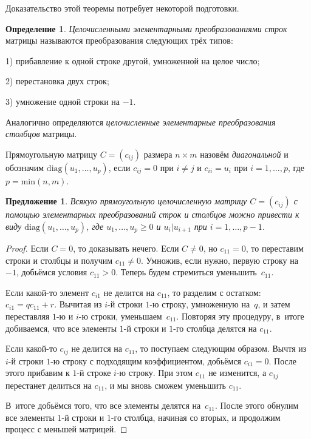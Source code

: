 \documentclass[a4paper,10pt]{amsart}
\newtheorem{proposition}{Предложение}
\theoremstyle{definition}
\newtheorem{definition}{Определение}
\theoremstyle{remark}
\begin{document}
\smallskip


Доказательство этой теоремы потребует некоторой подготовки.

\begin{definition}
{\it Целочисленными элементарными преобразованиями строк} матрицы
называются преобразования следующих трёх типов:

1) прибавление к одной строке другой, умноженной на целое число;

2) перестановка двух строк;

3) умножение одной строки на $-1$.

Аналогично определяются {\it целочисленные элементарные
преобразования столбцов} матрицы.
\end{definition}

Прямоугольную матрицу $C=(c_{ij})$ размера $n\times m$ назовём {\it
диагональной} и обозначим $\text{diag}(u_1,\ldots,u_p)$, если
$c_{ij}=0$ при $i\ne j$ и $c_{ii}=u_i$ при $i=1,\ldots,p$, где
$p=\text{min}(n,m)$.

\begin{proposition} \label{palg}
Всякую прямоугольную целочисленную матрицу $C=(c_{ij})$ с помощью
элементарных преобразований строк и столбцов можно привести к виду
$\text{diag}(u_1,\ldots,u_p)$, где $u_1,\ldots,u_p \geqslant 0$ и
$u_i|u_{i+1}$ при $i=1,\ldots,p-1$.
\end{proposition}

\begin{proof}
Если $C=0$, то доказывать нечего. Если $C\ne 0$, но $c_{11}=0$, то
переставим строки и столбцы и получим $c_{11}\ne 0$. Умножив, если
нужно, первую строку на $-1$, добьёмся условия $c_{11}>0$. Теперь
будем стремиться уменьшить~$c_{11}$.

Если какой-то элемент $c_{i1}$ не делится на $c_{11}$, то разделим с
остатком: $c_{i1}=qc_{11}+r$. Вычитая из $i$-й строки $1$-ю строку,
умноженную на~$q$, и затем переставляя $1$-ю и $i$-ю строки,
уменьшаем~$c_{11}$. Повторяя эту процедуру, в~итоге добиваемся, что
все элементы $1$-й строки и $1$-го столбца делятся на $c_{11}$.

Если какой-то $c_{ij}$ не делится на $c_{11}$, то поступаем
следующим образом. Вычтя из $i$-й строки $1$-ю строку с подходящим
коэффициентом, добьёмся $c_{i1}=0$. После этого прибавим к $1$-й
строке $i$-ю строку. При этом $c_{11}$ не изменится, а $c_{1j}$
перестанет делиться на $c_{11}$, и мы вновь сможем уменьшить
$c_{11}$.

В~итоге добьёмся того, что все элементы делятся на~$c_{11}$. После
этого обнулим все элементы $1$-й строки и $1$-го столбца, начиная со
вторых, и продолжим процесс с меньшей матрицей.
\end{proof}
\end{document}
